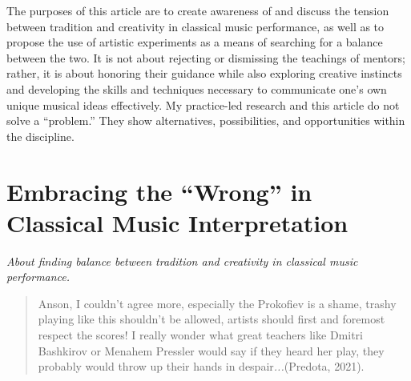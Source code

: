\documentclass[authordate, empirical, issue]{jote-new-article}
\begin{document}
The purposes of this article are to create awareness of and discuss the tension between tradition and creativity in classical music performance, as well as to propose the use of artistic experiments as a means of searching for a balance between the two. It is not about rejecting or dismissing the teachings of mentors; rather, it is about honoring their guidance while also exploring creative instincts and developing the skills and techniques necessary to communicate one's own unique musical ideas effectively. My practice-led research and this article do not solve a “problem.” They show alternatives, possibilities, and opportunities within the discipline.























\section{Embracing the “Wrong” in Classical Music Interpretation}

\emph{About finding balance between tradition and creativity in classical music performance.}







\begin{quote}
  Anson, I couldn't agree more, especially the Prokofiev is a shame, trashy playing like this shouldn't be allowed, artists should first and foremost respect the scores! I really wonder what great teachers like Dmitri Bashkirov or Menahem Pressler would say if they heard her play, they probably would throw up their hands in despair\emph{...}(Predota, 2021).
\end{quote}
\end{document}
